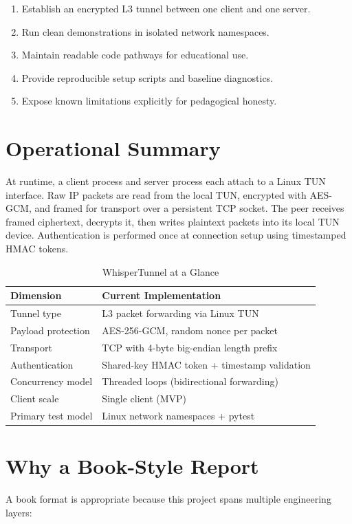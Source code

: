 \begin{enumerate}[leftmargin=2em]
\item Establish an encrypted L3 tunnel between one client and one server.
\item Run clean demonstrations in isolated network namespaces.
\item Maintain readable code pathways for educational use.
\item Provide reproducible setup scripts and baseline diagnostics.
\item Expose known limitations explicitly for pedagogical honesty.
\end{enumerate}

\section{Operational Summary}
At runtime, a client process and server process each attach to a Linux TUN interface. Raw IP packets are read from the local TUN, encrypted with AES-GCM, and framed for transport over a persistent TCP socket. The peer receives framed ciphertext, decrypts it, then writes plaintext packets into its local TUN device. Authentication is performed once at connection setup using timestamped HMAC tokens.

\begin{table}[H]
\centering
\caption{WhisperTunnel at a Glance}
\begin{tabular}{p{}p{}}
\toprule
\textbf{Dimension} & \textbf{Current Implementation} \\
\midrule
Tunnel type & L3 packet forwarding via Linux TUN \\
Payload protection & AES-256-GCM, random nonce per packet \\
Transport & TCP with 4-byte big-endian length prefix \\
Authentication & Shared-key HMAC token + timestamp validation \\
Concurrency model & Threaded loops (bidirectional forwarding) \\
Client scale & Single client (MVP) \\
Primary test model & Linux network namespaces + pytest \\
\bottomrule
\end{tabular}
\end{table}

\section{Why a Book-Style Report}
A book format is appropriate because this project spans multiple engineering layers:


